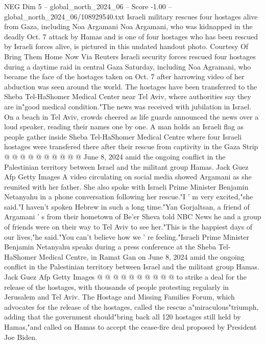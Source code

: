 \begin{textsample}{NEG Dim 5 – global\_north\_2024\_06 – Score -1.00 – global\_north\_2024\_06/108929540.txt}  \label{ex:f5_neg_132}
Israeli military rescues four hostages alive from Gaza, including Noa Argamani Noa Argamani, who was kidnapped in the deadly Oct. 7 attack by Hamas and is one of four hostages who has been rescued by Israeli forces alive, is pictured in this undated handout photo.
Courtesy Of Bring Them Home Now Via Reuters Israeli security forces rescued four hostages during a daytime raid in central Gaza Saturday, including Noa Agramani, who became the face of the hostages taken on Oct. 7 after harrowing video of her abduction was seen around the world.
The hostages have been transferred to the Sheba Tel-HaShomer Medical Center near Tel Aviv, where authorities say they are in"good medical condition."The news was received with jubilation in Israel.
On a beach in Tel Aviv, crowds cheered as life guards announced the news over a loud speaker, reading their names one by one.
A man holds an Israeli flag as people gather inside Sheba Tel-HaShomer Medical Centre where four Israeli hostages were transfered there after their rescue from captivity in the Gaza Strip @ @ @ @ @ @ @ @ @ @ June 8, 2024 amid the ongoing conflict in the Palestinian territory between Israel and the militant group Hamas.
Jack Guez Afp Getty Images A video circulating on social media showed Argamani as she reunited with her father.
She also spoke with Israeli Prime Minister Benjamin Netanyahu in a phone conversation following her rescue."I ' m very excited,"she said."I haven't spoken Hebrew in such a long time."Yan Gorjaltsan, a friend of Argamani ' s from their hometown of Be'er Sheva told NBC News he and a group of friends were on their way to Tel Aviv to see her."This is the happiest days of our lives,"he said."You can't believe how we ' re feeling."Israeli Prime Minister Benjamin Netanyahu speaks during a press conference at the Sheba Tel-HaShomer Medical Centre, in Ramat Gan on June 8, 2024 amid the ongoing conflict in the Palestinian territory between Israel and the militant group Hamas.
Jack Guez Afp Getty Images @ @ @ @ @ @ @ @ @ @ to strike a deal for the release of the hostages, with thousands of people protesting regularly in Jerusalem and Tel Aviv.
The Hostage and Missing Families Forum, which advocates for the release of the hostages, called the rescue a"miraculous"triumph, adding that the government should"bring back all 120 hostages still held by Hamas,"and called on Hamas to accept the cease-fire deal proposed by President Joe Biden.

\end{textsample}
